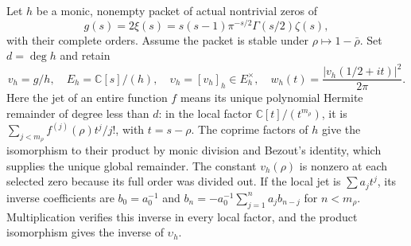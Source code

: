 \documentclass[11pt]{article}
\newcommand{\C}{\mathbb C}
\begin{document}
Let $h$ be a monic, nonempty packet of actual nontrivial zeros of
\[
 g(s)=2\xi(s)=s(s-1)\pi^{-s/2}\Gamma(s/2)\zeta(s),
\]
with their complete orders. Assume the packet is stable under
$\rho\mapsto1-\bar\rho$. Set $d=\deg h$ and retain
\[
 v_h=g/h,\quad E_h=\C[s]/(h),\quad
 \upsilon_h=[v_h]_h\in E_h^\times,\quad
 w_h(t)=\frac{|v_h(1/2+it)|^2}{2\pi}.
 \tag{TVB.1}
\]
Here the jet of an entire function $f$ means its unique polynomial
Hermite remainder of degree less than $d$: in the local factor
$\C[t]/(t^{m_\rho})$, it is
$\sum_{j<m_\rho}f^{(j)}(\rho)t^j/j!$, with $t=s-\rho$.
The coprime factors of $h$ give the isomorphism to their product
by monic division and Bezout's identity, which supplies the
unique global remainder. The constant $v_h(\rho)$ is nonzero
at each selected zero because its full order was divided out.
If the local jet is $\sum a_jt^j$, its inverse coefficients are
$b_0=a_0^{-1}$ and
$b_n=-a_0^{-1}\sum_{j=1}^n a_jb_{n-j}$ for $n<m_\rho$.
Multiplication verifies this inverse in every local factor,
and the product isomorphism gives the inverse of $\upsilon_h$.
\end{document}
